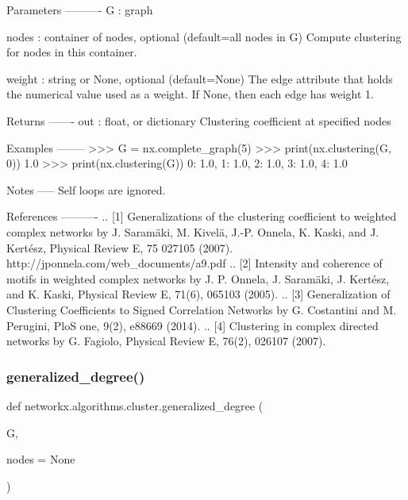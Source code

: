 \begin{DoxyVerb}
Parameters
----------
G : graph

nodes : container of nodes, optional (default=all nodes in G)
   Compute clustering for nodes in this container.

weight : string or None, optional (default=None)
   The edge attribute that holds the numerical value used as a weight.
   If None, then each edge has weight 1.

Returns
-------
out : float, or dictionary
   Clustering coefficient at specified nodes

Examples
--------
>>> G = nx.complete_graph(5)
>>> print(nx.clustering(G, 0))
1.0
>>> print(nx.clustering(G))
{0: 1.0, 1: 1.0, 2: 1.0, 3: 1.0, 4: 1.0}

Notes
-----
Self loops are ignored.

References
----------
.. [1] Generalizations of the clustering coefficient to weighted
   complex networks by J. Saramäki, M. Kivelä, J.-P. Onnela,
   K. Kaski, and J. Kertész, Physical Review E, 75 027105 (2007).
   http://jponnela.com/web_documents/a9.pdf
.. [2] Intensity and coherence of motifs in weighted complex
   networks by J. P. Onnela, J. Saramäki, J. Kertész, and K. Kaski,
   Physical Review E, 71(6), 065103 (2005).
.. [3] Generalization of Clustering Coefficients to Signed Correlation Networks
   by G. Costantini and M. Perugini, PloS one, 9(2), e88669 (2014).
.. [4] Clustering in complex directed networks by G. Fagiolo,
   Physical Review E, 76(2), 026107 (2007).
\end{DoxyVerb}
 \mbox{\label{namespacenetworkx_1_1algorithms_1_1cluster_a51b9017a248ec56d2af902b4a05e0046}} 
\subsubsection{\texorpdfstring{generalized\+\_\+degree()}{generalized\_degree()}}
{\footnotesize\ttfamily def networkx.\+algorithms.\+cluster.\+generalized\+\_\+degree (\begin{DoxyParamCaption}\item[{}]{G,  }\item[{}]{nodes = {\ttfamily None} }\end{DoxyParamCaption})}

